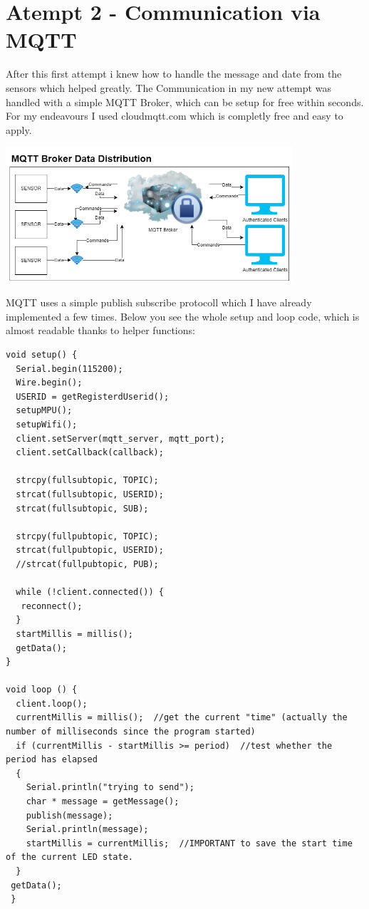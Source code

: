\section{Atempt 2 - Communication via MQTT}

After this first attempt i knew how to handle the message and date from the sensors which helped greatly. 
The Communication in my new attempt was handled with a simple MQTT Broker, which can be setup for free within seconds. For my endeavours I used cloudmqtt.com which is completly free and easy to apply. 


\begin{center}
\includegraphics[width=0.8\textwidth]{images/CommunicationDiagrammMQTT.png}
\end{center}
MQTT uses a simple publish subscribe protocoll which I have already implemented a few times.
Below you see the whole setup and loop code, which is almost readable thanks to helper functions:
\begin{lstlisting}
void setup() {
  Serial.begin(115200);
  Wire.begin();
  USERID = getRegisterdUserid();
  setupMPU();
  setupWifi();
  client.setServer(mqtt_server, mqtt_port);
  client.setCallback(callback);

  strcpy(fullsubtopic, TOPIC); 
  strcat(fullsubtopic, USERID);
  strcat(fullsubtopic, SUB);
  
  strcpy(fullpubtopic, TOPIC); 
  strcat(fullpubtopic, USERID);
  //strcat(fullpubtopic, PUB);
  
  while (!client.connected()) {
   reconnect();
  }
  startMillis = millis(); 
  getData();
}

void loop () {
  client.loop();
  currentMillis = millis();  //get the current "time" (actually the number of milliseconds since the program started)
  if (currentMillis - startMillis >= period)  //test whether the period has elapsed
  {
    Serial.println("trying to send");
    char * message = getMessage();
    publish(message);
    Serial.println(message);
    startMillis = currentMillis;  //IMPORTANT to save the start time of the current LED state.
  }
 getData();
 }
\end{lstlisting}

